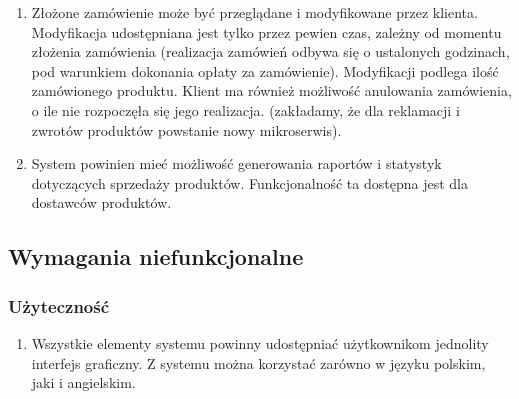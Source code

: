 \documentclass[11pt,a4paper,twoside]{article}
\begin{document}
\begin{enumerate}[start=1,label={WF\arabic*.}]
\item Złożone zamówienie może być przeglądane i modyfikowane przez klienta. Modyfikacja udostępniana jest tylko przez pewien czas, zależny od momentu złożenia zamówienia (realizacja zamówień odbywa się o ustalonych godzinach, pod warunkiem dokonania opłaty za zamówienie). Modyfikacji podlega ilość zamówionego produktu. Klient ma również możliwość anulowania zamówienia, o ile nie rozpoczęła się jego realizacja. (zakładamy, że dla reklamacji i zwrotów produktów powstanie nowy mikroserwis). 
\item System powinien mieć możliwość generowania raportów i statystyk dotyczących sprzedaży produktów. Funkcjonalność ta dostępna jest dla dostawców produktów.
\end{enumerate}

\subsection{Wymagania niefunkcjonalne}
\subsubsection{Użyteczność}
\begin{enumerate}[start=1,label={WNF\arabic*.}]
\item Wszystkie elementy systemu powinny udostępniać użytkownikom jednolity interfejs graficzny. Z systemu można korzystać zarówno w języku polskim, jaki i angielskim.
\end{enumerate}
\end{document}
